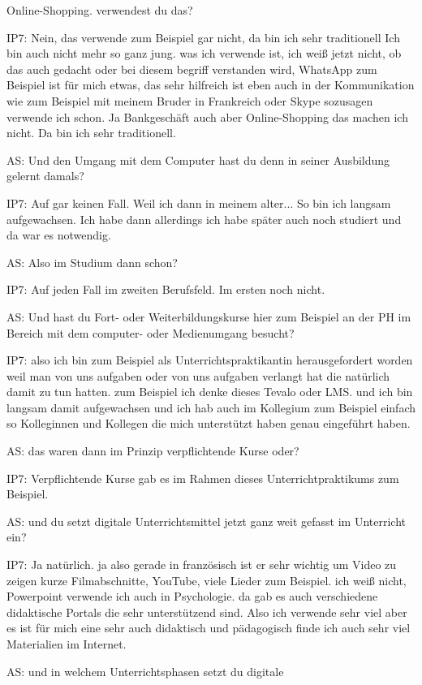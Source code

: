 \documentclass[fontsize=11pt,paper=a4]{scrbook}
\begin{document}
{\begin{itemize*}
Online-Shopping. verwendest du das?
\item[IP7:] Nein, das verwende zum Beispiel gar nicht, da bin
ich sehr traditionell Ich bin auch nicht
mehr so ganz jung. was ich verwende ist,
ich weiß jetzt nicht, ob das auch gedacht oder bei
diesem begriff verstanden wird,
WhatsApp zum Beispiel ist für mich etwas,
das sehr hilfreich ist eben auch in der
Kommunikation wie zum Beispiel mit
meinem Bruder in Frankreich oder Skype
sozusagen verwende ich schon.
Ja Bankgeschäft auch aber Online-Shopping das machen ich nicht. Da bin ich sehr traditionell.
\item[AS:] Und den Umgang mit dem Computer hast du denn in
seiner Ausbildung gelernt damals?
\item[IP7:] Auf gar keinen Fall. Weil ich dann in 
meinem alter...  So bin ich langsam
aufgewachsen. Ich habe dann allerdings
ich habe später auch noch studiert und
da war es notwendig.
\item[AS:] Also im Studium dann schon?
\item[IP7:] Auf jeden Fall im zweiten
Berufsfeld. Im ersten noch nicht.
\item[AS:]Und hast du Fort-
oder Weiterbildungskurse hier zum
Beispiel an der PH im Bereich mit dem
computer- oder Medienumgang besucht?
\item[IP7:] also
ich bin zum Beispiel als Unterrichtspraktikantin herausgefordert worden weil
man von uns aufgaben oder von uns
aufgaben verlangt hat die natürlich damit
zu tun hatten. zum Beispiel ich denke
dieses Tevalo oder LMS. und ich bin langsam damit aufgewachsen
und ich hab auch im Kollegium zum
Beispiel
einfach so Kolleginnen und Kollegen die mich
unterstützt haben genau eingeführt haben.
\item[AS:] das waren dann im Prinzip verpflichtende Kurse oder?
\item[IP7:]Verpflichtende Kurse gab es im Rahmen
dieses Unterrichtpraktikums zum Beispiel.
\item[AS:] und du
setzt digitale Unterrichtsmittel jetzt
ganz weit gefasst im Unterricht ein?
\item[IP7:] Ja natürlich. ja
also gerade in französisch ist er sehr
wichtig um Video zu zeigen kurze
Filmabschnitte, YouTube, viele Lieder zum Beispiel.
ich weiß nicht, Powerpoint verwende ich auch
in Psychologie.
da gab es auch verschiedene didaktische
Portals die sehr unterstützend sind. Also ich verwende sehr viel aber es
ist für mich eine sehr auch didaktisch
und pädagogisch finde ich auch sehr viel
Materialien im Internet.
\item[AS:] und in welchem Unterrichtsphasen setzt du digitale

\end{itemize*}}
\end{document}
